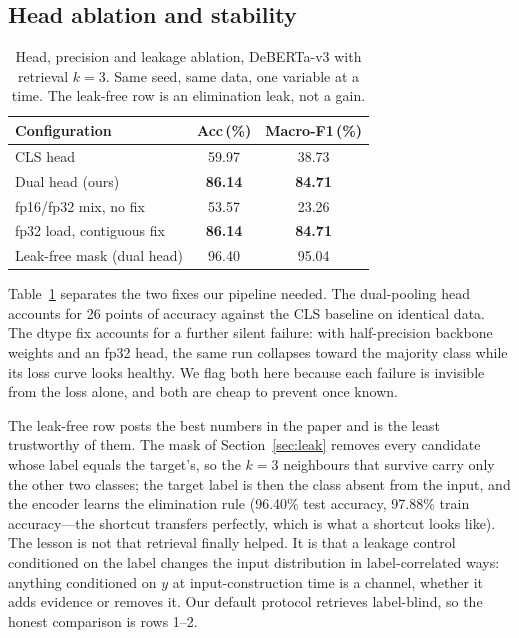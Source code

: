 \documentclass[10pt,twocolumn,twoside]{article}
\begin{document}
\subsection{Head ablation and stability}\label{sec:ablation}

\begin{table}[t]
\caption{Head, precision and leakage ablation, DeBERTa-v3 with retrieval
$k{=}3$. Same seed, same data, one variable at a time. The leak-free row is
an elimination leak, not a gain.}
\label{tab:head}
\begin{center}
\small
\begin{tabular}{lcc}
\toprule
\textbf{Configuration} & \textbf{Acc\,(\%)} & \textbf{Macro-F1\,(\%)}\\
\midrule
CLS head                    & 59.97 & 38.73\\
Dual head (ours)            & \textbf{86.14} & \textbf{84.71}\\
\midrule
fp16/fp32 mix, no fix       & 53.57 & 23.26\\
fp32 load, contiguous fix   & \textbf{86.14} & \textbf{84.71}\\
\midrule
Leak-free mask (dual head)  & 96.40 & 95.04\\
\bottomrule
\end{tabular}
\end{center}
\end{table}

Table~\ref{tab:head} separates the two fixes our pipeline needed. The
dual-pooling head accounts for 26 points of accuracy against the CLS baseline
on identical data. The dtype fix accounts for a further silent failure: with
half-precision backbone weights and an fp32 head, the same run collapses
toward the majority class while its loss curve looks healthy. We flag both
here because each failure is invisible from the loss alone, and both are
cheap to prevent once known.

The leak-free row posts the best numbers in the paper and is the least
trustworthy of them. The mask of Section~\ref{sec:leak} removes every
candidate whose label equals the target's, so the $k{=}3$ neighbours that
survive carry only the other two classes; the target label is then the
class absent from the input, and the encoder learns the elimination rule
(96.40\% test accuracy, 97.88\% train accuracy---the shortcut transfers
perfectly, which is what a shortcut looks like). The lesson is not that
retrieval finally helped. It is that a leakage control conditioned on the
label changes the input distribution in label-correlated ways: anything
conditioned on $y$ at input-construction time is a channel, whether it adds
evidence or removes it. Our default protocol retrieves label-blind, so the
honest comparison is rows 1--2.
\end{document}
